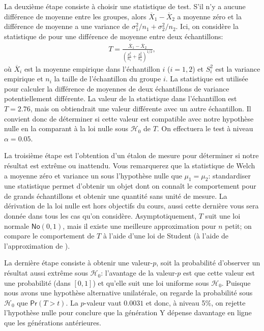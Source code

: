 \documentclass[
  11pt,
  letterpaper,
]{book}
\begin{document}
La deuxième étape consiste à choisir une statistique de test. S'il n'y a aucune différence de moyenne entre les groupes, alors \(\overline{X}_1-\overline{X}_2\) a moyenne zéro et la différence de moyenne a une variance de \(\sigma^2_1/n_1+\sigma^2_2/n_2\). Ici, on considère la statistique de \citet{Welch:1947} pour une différence de moyenne entre deux échantillons:
\begin{align*}
T = \frac{\overline{X}_1 - \overline{X}_2}{\left(\frac{S_1^2}{n_1}+\frac{S_2^2}{n_2} \right)^{1/2}}, \end{align*}
où \(\overline{X}_i\) est la moyenne empirique dans l'échantillon \(i\) (\(i=1, 2\)) et \(S_i^2\) est la variance empirique et \(n_i\) la taille de l'échantillon du groupe \(i\). La statistique est utilisée pour calculer la différence de moyennes de deux échantillons de variance potentiellement différente. La valeur de la statistique dans l'échantillon est \(T=2.76\), mais on obtiendrait une valeur différente avec un autre échantillon. Il convient donc de déterminer si cette valeur est compatible avec notre hypothèse nulle en la comparant à la loi nulle sous \(\mathscr{H}_0\) de \(T\). On effectuera le test à niveau \(\alpha=0.05\).

La troisième étape est l'obtention d'un étalon de mesure pour déterminer si notre résultat est extrême ou inattendu. Vous remarquerez que la statistique de Welch a moyenne zéro et variance un sous l'hypothèse nulle que \(\mu_1=\mu_2\): standardiser une statistique permet d'obtenir un objet dont on connaît le comportement pour de grands échantillons et obtenir une quantité sans unité de mesure. La dérivation de la loi nulle est hors objectifs du cours, aussi cette dernière vous sera donnée dans tous les cas qu'on considère. Asymptotiquement, \(T\) suit une loi normale \(\mathsf{No}(0, 1)\), mais il existe une meilleure approximation pour \(n\) petit; on compare le comportement de \(T\) à l'aide d'une loi de Student (à l'aide de l'approximation de \citet{Satterthwaite:1946}).

La dernière étape consiste à obtenir une valeur-\(p\), soit la probabilité d'observer un résultat aussi extrême sous \(\mathscr{H}_0\): l'avantage de la valeur-\(p\) est que cette valeur est une probabilité (dans \([0, 1]\)) et qu'elle suit une loi uniforme sous \(\mathscr{H}_0\). Puisque nous avons une hypothèse alternative unilatérale, on regarde la probabilité sous \(\mathscr{H}_0\) que \(\mathsf{Pr}(T > t)\). La \(p\)-valeur vaut \(0.0031\) et donc, à niveau 5\%, on rejette l'hypothèse nulle pour conclure que la génération Y dépense davantage en ligne que les générations antérieures.
\end{document}
